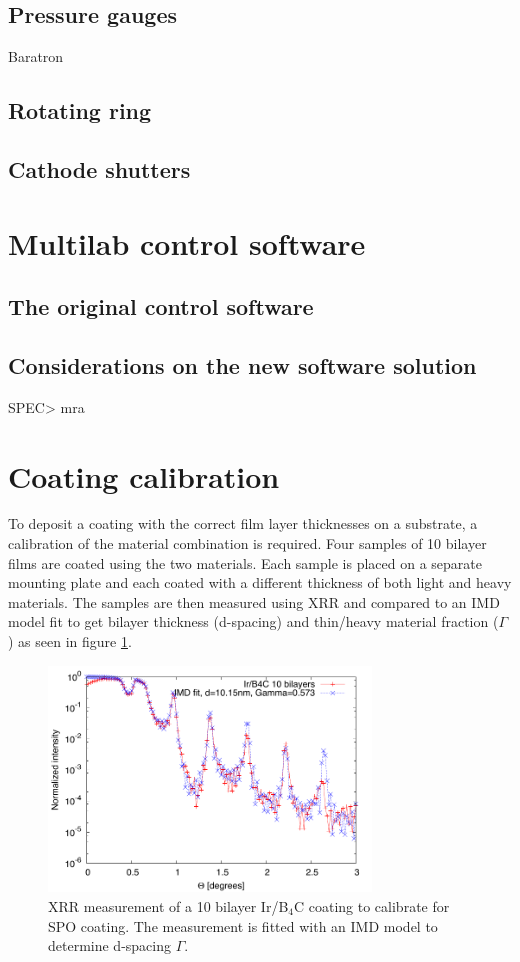 \subsection{Pressure gauges}
Baratron\\

\subsection{Rotating ring}

\subsection{Cathode shutters}

\section{Multilab control software}\label{sec:ml_software}

\subsection{The original control software}

\subsection{Considerations on the new software solution}
\begin{verbcode}
  SPEC> mra
\end{verbcode}

\section{Coating calibration}
To deposit a coating with the correct film layer thicknesses on a substrate, a calibration of the material combination is required. Four samples of 10 bilayer films are coated using the two materials. Each sample is placed on a separate mounting plate and each coated with a different thickness of both light and heavy materials. The samples are then measured using XRR and compared to an IMD model fit to get bilayer thickness (d-spacing) and thin/heavy material fraction ($\Gamma$) as seen in figure \ref{fig:irb4c-fit}.

\begin{figure}[!h]
  \center
  \includegraphics[height=6cm]{figures/chamber/si5811-fit.pdf}
\caption{\footnotesize XRR measurement of a 10 bilayer Ir/B$_4$C coating to calibrate for SPO coating. The measurement is fitted with an IMD model to determine d-spacing $\Gamma$.}\label{fig:irb4c-fit}
\end{figure}

